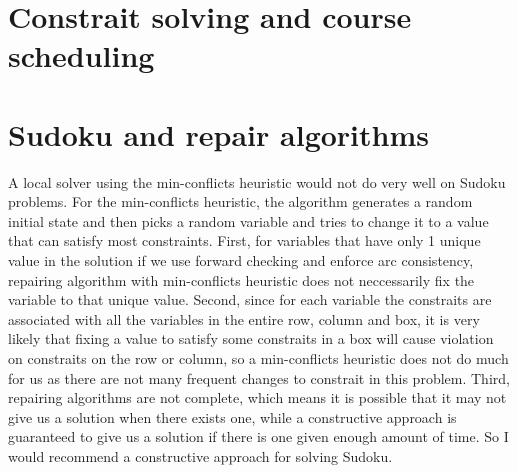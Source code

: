 \documentclass[11pt]{article}
\begin{document}
\begin{onehalfspace}
\begin{itemize}
\end{itemize}
\section{Constrait solving and course scheduling}
\section{Sudoku and repair algorithms}
A local solver using the min-conflicts heuristic would not do very well on Sudoku problems. For the min-conflicts heuristic, the algorithm generates a random initial state and then picks a random variable and tries to change it to a value that can satisfy most constraints. First, for variables that have only 1 unique value in the solution if we use forward checking and enforce arc consistency, repairing algorithm with min-conflicts heuristic does not neccessarily fix the variable to that unique value. Second, since for each variable the constraits are associated with all the variables in the entire row, column and box, it is very likely that fixing a value to satisfy some constraits in a box will cause violation on constraits on the row or column, so a min-conflicts heuristic does not do much for us as there are not many frequent changes to constrait in this problem. Third, repairing algorithms are not complete, which means it is possible that it may not give us a solution when there exists one, while a constructive approach is guaranteed to give us a solution if there is one given enough amount of time. So I would recommend a constructive approach for solving Sudoku.
\end{onehalfspace}
\end{document}
